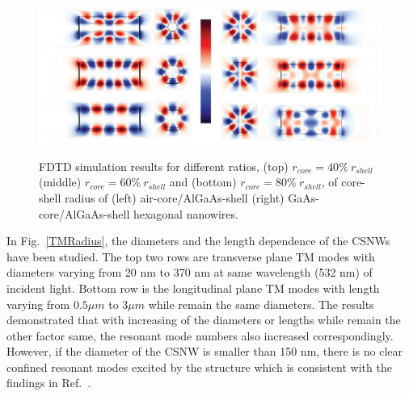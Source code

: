 \begin{figure}
  \caption{FDTD simulation results for different ratios, (top) $r_{core} = 40\%\ r_{shell}$ (middle) $r_{core} = 60\%\ r_{shell}$ and (bottom) $r_{core} = 80\%\ r_{shell}$, of core-shell radius of (left) air-core/AlGaAs-shell (right) GaAs-core/AlGaAs-shell hexagonal nanowires.}
  \centering
  \includegraphics[width=\textwidth]{pictures/LM/HexRP}
  \label{HexRP}
\end{figure}

In Fig.~\ref{TMRadius}, the diameters and the length dependence of the CSNWs
have been studied. The top two rows are transverse plane TM modes with
diameters varying from 20 nm to 370 nm at same wavelength (532 nm) of incident
light. Bottom row is the longitudinal plane TM modes with length varying from
$0.5 \mu{m}$ to $3 \mu{m}$ while remain the same diameters. The results
demonstrated that with increasing of the diameters or lengths while remain the
other factor same, the resonant mode numbers also increased correspondingly.
However, if the diameter of the CSNW is smaller than 150 nm, there is no clear
confined resonant modes excited by the structure which is consistent with the
findings in Ref.~\cite{Zimmler:2008fc}.

